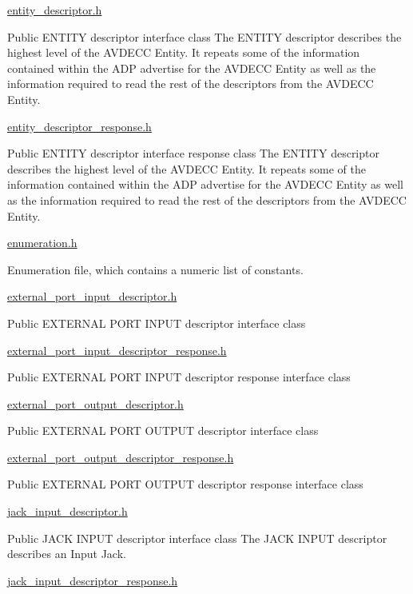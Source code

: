 \hyperlink{entity__descriptor_8h}{entity\+\_\+descriptor.\+h}

Public E\+N\+T\+I\+TY descriptor interface class The E\+N\+T\+I\+TY descriptor describes the highest level of the A\+V\+D\+E\+CC Entity. It repeats some of the information contained within the A\+DP advertise for the A\+V\+D\+E\+CC Entity as well as the information required to read the rest of the descriptors from the A\+V\+D\+E\+CC Entity.

\hyperlink{entity__descriptor__response_8h}{entity\+\_\+descriptor\+\_\+response.\+h}

Public E\+N\+T\+I\+TY descriptor interface response class The E\+N\+T\+I\+TY descriptor describes the highest level of the A\+V\+D\+E\+CC Entity. It repeats some of the information contained within the A\+DP advertise for the A\+V\+D\+E\+CC Entity as well as the information required to read the rest of the descriptors from the A\+V\+D\+E\+CC Entity.

\hyperlink{enumeration_8h}{enumeration.\+h}

Enumeration file, which contains a numeric list of constants.

\hyperlink{external__port__input__descriptor_8h}{external\+\_\+port\+\_\+input\+\_\+descriptor.\+h}

Public E\+X\+T\+E\+R\+N\+AL P\+O\+RT I\+N\+P\+UT descriptor interface class

\hyperlink{external__port__input__descriptor__response_8h}{external\+\_\+port\+\_\+input\+\_\+descriptor\+\_\+response.\+h}

Public E\+X\+T\+E\+R\+N\+AL P\+O\+RT I\+N\+P\+UT descriptor response interface class

\hyperlink{external__port__output__descriptor_8h}{external\+\_\+port\+\_\+output\+\_\+descriptor.\+h}

Public E\+X\+T\+E\+R\+N\+AL P\+O\+RT O\+U\+T\+P\+UT descriptor interface class

\hyperlink{external__port__output__descriptor__response_8h}{external\+\_\+port\+\_\+output\+\_\+descriptor\+\_\+response.\+h}

Public E\+X\+T\+E\+R\+N\+AL P\+O\+RT O\+U\+T\+P\+UT descriptor response interface class

\hyperlink{jack__input__descriptor_8h}{jack\+\_\+input\+\_\+descriptor.\+h}

Public J\+A\+CK I\+N\+P\+UT descriptor interface class The J\+A\+CK I\+N\+P\+UT descriptor describes an Input Jack.

\hyperlink{jack__input__descriptor__response_8h}{jack\+\_\+input\+\_\+descriptor\+\_\+response.\+h}

